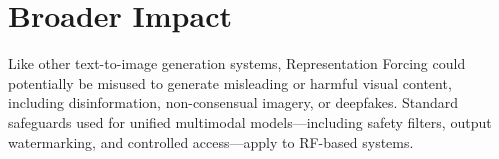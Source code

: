 \documentclass{llmxive}
\begin{document}
\section{Broader Impact}

Like other text-to-image generation systems, Representation Forcing could potentially be misused to generate misleading or harmful visual content, including disinformation, non-consensual imagery, or deepfakes. Standard safeguards used for unified multimodal models---including safety filters, output watermarking, and controlled access---apply to RF-based systems.
\end{document}
